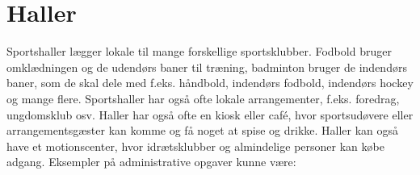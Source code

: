 










\section{Haller}

Sportshaller lægger lokale til mange forskellige sportsklubber. Fodbold bruger omklædningen og de
udendørs baner til træning, badminton bruger de indendørs baner, som de skal dele med f.eks. håndbold,
indendørs fodbold, indendørs hockey og mange flere. Sportshaller har også ofte lokale arrangementer, f.eks.
foredrag, ungdomsklub osv. Haller har også ofte en kiosk eller café, hvor sportsudøvere eller
arrangementsgæster kan komme og få noget at spise og drikke. Haller kan også have et motionscenter, hvor
idrætsklubber og almindelige personer kan købe adgang\citep{spt_hal}. Eksempler på administrative opgaver
kunne være:

